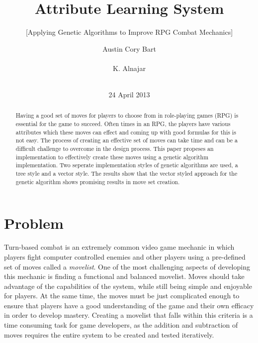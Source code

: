 \documentclass{acm_proc_article-sp}
\begin{document}
\title{Attribute Learning System}
\subtitle{[Applying Genetic Algorithms to Improve RPG Combat Mechanics]} %



\author{
\alignauthor
Austin Cory Bart\\
       \\
\alignauthor
K. Alnajar\\
       \\
\alignauthor
}

\date{24 April 2013}

\maketitle
\begin{abstract}
Having a good set of moves for players to choose from in role-playing games (RPG) is essential for the game to succeed.  Often times in an RPG, the players have various attributes which these moves can effect and coming up with good formulas for this is not easy. The process of creating an effective set of moves can take time and can be a difficult challenge to overcome in the design process. This paper propeses an implementation to effectively create these moves using a genetic algorithm implementation. Two seperate implementation styles of genetic algorithms are used, a tree style and a vector style. The results show that the vector styled approach for the genetic algorithm shows promising results in move set creation.
\end{abstract}




\section{Problem}

Turn-based combat is an extremely common video game mechanic in which players fight computer controlled enemies and other players using a pre-defined set of moves called a \textit{movelist}. One of the most challenging aspects of developing this mechanic is finding a functional and balanced movelist. Moves should take advantage of the capabilities of the system, while still being simple and enjoyable for players. At the same time, the moves must be just complicated enough to ensure that players have a good understanding of the game and their own efficacy in order to develop mastery. Creating a movelist that falls within this criteria is a time consuming task for game developers, as the addition and subtraction of moves requires the entire system to be created and tested iteratively. 
\end{document}

